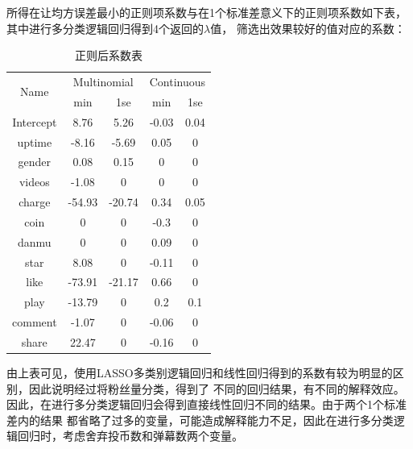 \documentclass{ctexart}
\begin{document}
所得在让均方误差最小的正则项系数与在1个标准差意义下的正则项系数如下表，其中进行多分类逻辑回归得到4个返回的$\lambda$值，
筛选出效果较好的值对应的系数：

\begin{table}[H]
    \centering
    \begin{tabular}{ccccc}
    \hline
    \multirow{2}{*}{Name} & \multicolumn{2}{c}{Multinomial} & \multicolumn{2}{c}{Continuous} \\ \cline{2-5} 
                          & min            & 1se            & min            & 1se           \\ \hline
    Intercept             & 8.76           & 5.26           & -0.03          & 0.04          \\
    uptime                & -8.16          & -5.69          & 0.05           & 0             \\
    gender                & 0.08           & 0.15           & 0              & 0             \\
    videos                & -1.08          & 0              & 0              & 0             \\
    charge                & -54.93         & -20.74         & 0.34           & 0.05          \\
    coin                  & 0              & 0              & -0.3           & 0             \\
    danmu                 & 0              & 0              & 0.09           & 0             \\
    star                  & 8.08           & 0              & -0.11          & 0             \\
    like                  & -73.91         & -21.17         & 0.66           & 0             \\
    play                  & -13.79         & 0              & 0.2            & 0.1           \\
    comment               & -1.07          & 0              & -0.06          & 0             \\
    share                 & 22.47          & 0              & -0.16          & 0             \\ \hline
    \end{tabular}
    \caption{正则后系数表}
\end{table}

由上表可见，使用LASSO多类别逻辑回归和线性回归得到的系数有较为明显的区别，因此说明经过将粉丝量分类，得到了
不同的回归结果，有不同的解释效应。因此，在进行多分类逻辑回归会得到直接线性回归不同的结果。由于两个1个标准差内的结果
都省略了过多的变量，可能造成解释能力不足，因此在进行多分类逻辑回归时，考虑舍弃投币数和弹幕数两个变量。
\end{document}
